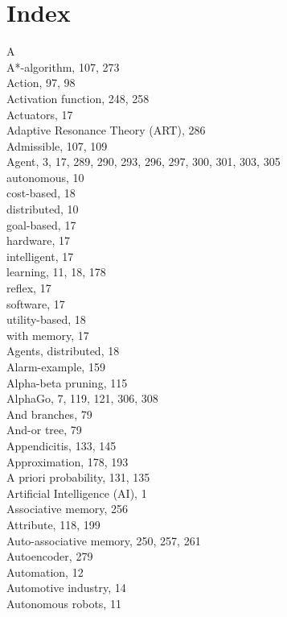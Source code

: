\documentclass[10pt]{book}
\begin{document}
\section*{Index}
A\\

A*-algorithm, 107, 273\\
Action, 97, 98\\
Activation function, 248, 258\\
Actuators, 17\\
Adaptive Resonance Theory (ART), 286\\
Admissible, 107, 109\\
Agent, 3, 17, 289, 290, 293, 296, 297, 300, 301, 303, 305\\
autonomous, 10\\
cost-based, 18\\
distributed, 10\\
goal-based, 17\\
hardware, 17\\
intelligent, 17\\
learning, 11, 18, 178\\
reflex, 17\\
software, 17\\
utility-based, 18\\
with memory, 17\\
Agents, distributed, 18\\
Alarm-example, 159\\
Alpha-beta pruning, 115\\
AlphaGo, 7, 119, 121, 306, 308\\
And branches, 79\\
And-or tree, 79\\
Appendicitis, 133, 145\\
Approximation, 178, 193\\
A priori probability, 131, 135\\
Artificial Intelligence (AI), 1\\
Associative memory, 256\\
Attribute, 118, 199\\
Auto-associative memory, 250, 257, 261\\
Autoencoder, 279\\
Automation, 12\\
Automotive industry, 14\\
Autonomous robots, 11
\end{document}
